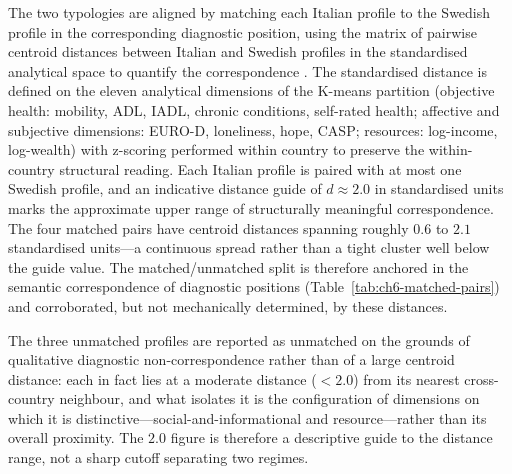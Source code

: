 The two typologies are aligned by matching each Italian profile to the Swedish profile in the corresponding diagnostic position, using the matrix of pairwise centroid distances between Italian and Swedish profiles in the standardised analytical space to quantify the correspondence \citep{kaufman1990}. The standardised distance is defined on the eleven analytical dimensions of the K-means partition (objective health: mobility, ADL, IADL, chronic conditions, self-rated health; affective and subjective dimensions: EURO-D, loneliness, hope, CASP; resources: log-income, log-wealth) with z-scoring performed within country to preserve the within-country structural reading. Each Italian profile is paired with at most one Swedish profile, and an indicative distance guide of $d \approx 2.0$ in standardised units marks the approximate upper range of structurally meaningful correspondence. The four matched pairs have centroid distances spanning roughly $0.6$ to $2.1$ standardised units---a continuous spread rather than a tight cluster well below the guide value. The matched/unmatched split is therefore anchored in the semantic correspondence of diagnostic positions (Table~\ref{tab:ch6-matched-pairs}) and corroborated, but not mechanically determined, by these distances.

The three unmatched profiles are reported as unmatched on the grounds of qualitative diagnostic non-correspondence rather than of a large centroid distance: each in fact lies at a moderate distance ($< 2.0$) from its nearest cross-country neighbour, and what isolates it is the configuration of dimensions on which it is distinctive---social-and-informational and resource---rather than its overall proximity. The $2.0$ figure is therefore a descriptive guide to the distance range, not a sharp cutoff separating two regimes.

